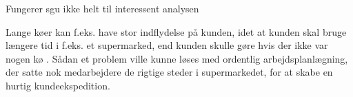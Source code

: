 


Fungerer sgu ikke helt til interessent analysen

Lange køer kan f.eks. have stor indflydelse på kunden, idet at kunden skal bruge længere tid i f.eks. et supermarked, end kunden skulle gøre hvis der ikke var nogen kø \citep{Brix2012}. Sådan et problem ville kunne løses med ordentlig arbejdsplanlægning, der satte nok medarbejdere de rigtige steder i supermarkedet, for at skabe en hurtig kundeekspedition. 